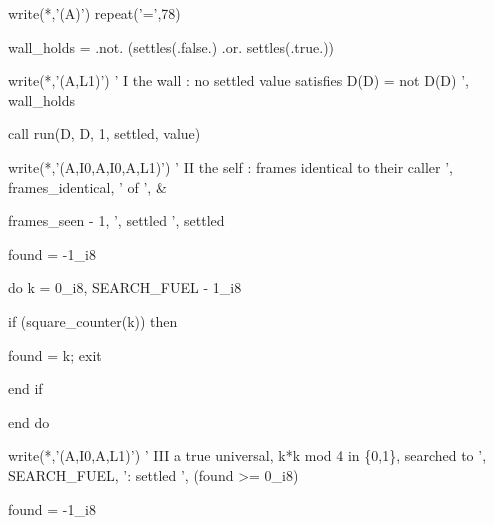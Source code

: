 \documentclass[10pt,twocolumn]{article}
\newenvironment{Shaded}{}{}
\newcommand{\BuiltInTok}[1]{#1}
\newcommand{\ConstantTok}[1]{#1}
\newcommand{\DecValTok}[1]{#1}
\newcommand{\FunctionTok}[1]{#1}
\newcommand{\KeywordTok}[1]{#1}
\newcommand{\NormalTok}[1]{#1}
\newcommand{\OperatorTok}[1]{#1}
\newcommand{\StringTok}[1]{#1}
\providecommand{\BuiltInTok}[1]{#1}
\providecommand{\ConstantTok}[1]{#1}
\providecommand{\DecValTok}[1]{#1}
\providecommand{\FunctionTok}[1]{#1}
\providecommand{\KeywordTok}[1]{#1}
\providecommand{\NormalTok}[1]{#1}
\providecommand{\OperatorTok}[1]{#1}
\providecommand{\StringTok}[1]{#1}
\providecommand{\textquotesingle}{'}
\providecommand{\BuiltInTok}[1]{#1}
\providecommand{\ConstantTok}[1]{#1}
\providecommand{\DecValTok}[1]{#1}
\providecommand{\FunctionTok}[1]{#1}
\providecommand{\KeywordTok}[1]{#1}
\providecommand{\NormalTok}[1]{#1}
\providecommand{\OperatorTok}[1]{#1}
\providecommand{\StringTok}[1]{#1}
\begin{document}
\begin{strip}
\begin{Shaded}
\begin{Highlighting}[]
  \FunctionTok{write(*}\NormalTok{,}\StringTok{\textquotesingle{}(A)\textquotesingle{}}\FunctionTok{)} \FunctionTok{repeat}\NormalTok{(}\StringTok{\textquotesingle{}=\textquotesingle{}}\NormalTok{,}\DecValTok{78}\NormalTok{)}

\NormalTok{  wall\_holds }\KeywordTok{=} \OperatorTok{.not.}\NormalTok{ (settles(}\ConstantTok{.false.}\NormalTok{) }\OperatorTok{.or.}\NormalTok{ settles(}\ConstantTok{.true.}\NormalTok{))}

  \FunctionTok{write(*}\NormalTok{,}\StringTok{\textquotesingle{}(A,L1)\textquotesingle{}}\FunctionTok{)} \StringTok{\textquotesingle{} I   the wall : no settled value satisfies D(D) = not D(D)          \textquotesingle{}}\NormalTok{, wall\_holds}

  \KeywordTok{call}\NormalTok{ run(D, D, }\DecValTok{1}\NormalTok{, settled, value)}

  \FunctionTok{write(*}\NormalTok{,}\StringTok{\textquotesingle{}(A,I0,A,I0,A,L1)\textquotesingle{}}\FunctionTok{)} \StringTok{\textquotesingle{} II  the self : frames identical to their caller \textquotesingle{}}\NormalTok{, frames\_identical, }\StringTok{\textquotesingle{} of \textquotesingle{}}\NormalTok{, }\KeywordTok{\&}

\NormalTok{       frames\_seen }\KeywordTok{{-}} \DecValTok{1}\NormalTok{, }\StringTok{\textquotesingle{}, settled \textquotesingle{}}\NormalTok{, settled}

\NormalTok{  found }\KeywordTok{=} \KeywordTok{{-}}\DecValTok{1\_i8}

  \KeywordTok{do}\NormalTok{ k }\KeywordTok{=} \DecValTok{0\_i8}\NormalTok{, SEARCH\_FUEL }\KeywordTok{{-}} \DecValTok{1\_i8}

\BuiltInTok{     i}\NormalTok{f (square\_counter(k)) }\KeywordTok{then}

\NormalTok{        found }\KeywordTok{=}\NormalTok{ k;  }\KeywordTok{exit}

\BuiltInTok{     e}\NormalTok{nd }\KeywordTok{if}

  \KeywordTok{end do}

  \FunctionTok{write(*}\NormalTok{,}\StringTok{\textquotesingle{}(A,I0,A,L1)\textquotesingle{}}\FunctionTok{)} \StringTok{\textquotesingle{} III a true universal, k*k mod 4 in \{0,1\}, searched to \textquotesingle{}}\NormalTok{, SEARCH\_FUEL, }\StringTok{\textquotesingle{}: settled \textquotesingle{}}\NormalTok{, (found }\OperatorTok{\textgreater{}=} \DecValTok{0\_i8}\NormalTok{)}

\NormalTok{  found }\KeywordTok{=} \KeywordTok{{-}}\DecValTok{1\_i8}


\end{Highlighting}
\end{Shaded}
\end{strip}
\end{document}
